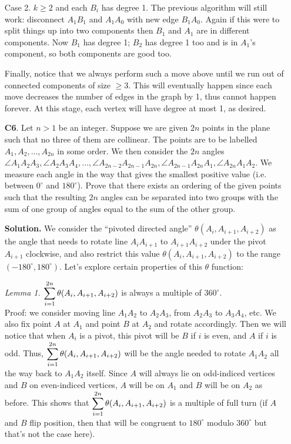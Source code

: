 \documentclass[11pt,a4paper]{article}
\begin{document}
\begin{enumerate}
	Case 2. $k\ge 2$ and each $B_i$ has degree 1. The previous algorithm will still work: disconnect $A_1B_1$ and $A_1A_0$ with new edge $B_1A_0$. Again if this were to split things up into two components then $B_1$ and $A_1$ are in different components. Now $B_1$ has degree 1; $B_2$ has degree 1 too and is in $A_1$'s component, so both components are good too.
	
	Finally, notice that we always perform such a move above until we run out of connected components of size $\ge 3$. This will eventually happen since each move decreases the number of edges in the graph by 1, thus cannot happen forever. At this stage, each vertex will have degree at most 1, as desired.
	
	\item[\textbf{C6}.] Let $n>1$ be an integer. Suppose we are given $2n$ points in the plane such that no three of them are collinear. The points are to be labelled $A_1, A_2, \dots , A_{2n}$ in some order. We then consider the $2n$ angles $\angle A_1A_2A_3, \angle A_2A_3A_4, \dots , \angle A_{2n-2}A_{2n-1}A_{2n}, \angle A_{2n-1}A_{2n}A_1, \angle A_{2n}A_1A_2$. We measure each angle in the way that gives the smallest positive value (i.e. between $0^{\circ}$ and $180^{\circ}$). Prove that there exists an ordering of the given points such that the resulting $2n$ angles can be separated into two groups with the sum of one group of angles equal to the sum of the other group.
	
	\textbf{Solution.} We consider the ``pivoted directed angle'' $\theta(A_i, A_{i+1}, A_{i+2})$ as the angle that needs to rotate line $A_iA_{i+1}$ to $A_{i+1}A_{i+2}$ under the pivot $A_{i+1}$ clockwise, and also restrict this value $\theta(A_i, A_{i+1}, A_{i+2})$ to the range $(-180^{\circ}, 180^{\circ})$. Let's explore certain properties of this $\theta$ function: 
	
	\emph{Lemma 1.} $\displaystyle\sum_{i=1}^{2n}\theta(A_i, A_{i+1}, A_{i+2})$ is always a multiple of $360^{\circ}$. \\
	Proof: we consider moving line $A_1A_2$ to $A_2A_3$, from $A_2A_3$ to $A_3A_4$, etc. 
	We also fix point $A$ at $A_1$ and point $B$ at $A_2$ and rotate accordingly. Then we will notice that when $A_i$ is a pivot, this pivot will be $B$ if $i$ is even, and $A$ if $i$ is odd. Thus, $\displaystyle\sum_{i=1}^{2n}\theta(A_i, A_{i+1}, A_{i+2})$ will be the angle needed to rotate $A_1A_2$ all the way back to $A_1A_2$ itself. Since $A$ will always lie on odd-indiced vertices and $B$ on even-indiced vertices, $A$ will be on $A_1$ and $B$ will be on $A_2$ as before. This shows that $\displaystyle\sum_{i=1}^{2n}\theta(A_i, A_{i+1}, A_{i+2})$ is a multiple of full turn (if $A$ and $B$ flip position, then that will be congruent to $180^{\circ}$ modulo $360^{\circ}$ but that's not the case here). 
	

\end{enumerate}
\end{document}
